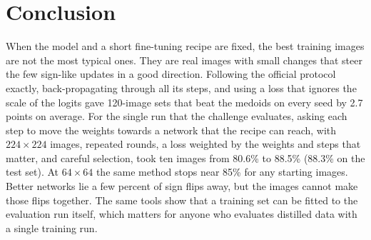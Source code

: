 \documentclass[journal]{IEEEtran}
\begin{document}
\section{Conclusion}
When the model and a short fine-tuning recipe are fixed, the best training images are not the most typical ones.
They are real images with small changes that steer the few sign-like updates in a good direction. Following the
official protocol exactly, back-propagating through all its steps, and using a loss that ignores the scale of the
logits gave 120-image sets that beat the medoids on every seed by 2.7 points on average. For the single run that
the challenge evaluates, asking each step to move the weights towards a network that the recipe can reach, with
$224\times224$ images, repeated rounds, a loss weighted by the weights and steps that matter, and careful selection,
took ten images from 80.6\% to 88.5\% (88.3\% on the test set). At $64\times64$ the same method stops near 85\%
for any starting images. Better networks lie a few percent of sign flips away, but the images cannot make those flips
together. The same tools show that a training set can be fitted to the evaluation run itself, which matters for
anyone who evaluates distilled data with a single training run.



\end{document}
